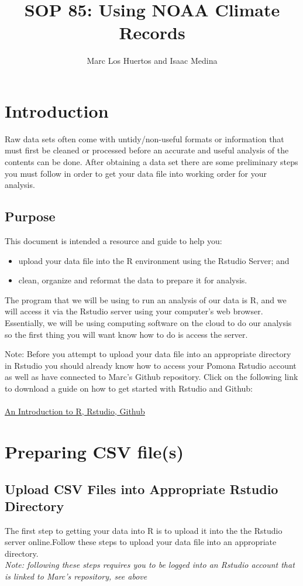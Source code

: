 \documentclass{article}\usepackage[]{graphicx}\usepackage[]{color}
\title{SOP 85: Using NOAA Climate Records}
\author{Marc Los Huertos and Isaac Medina}
\begin{document}
\maketitle

\section{Introduction}
Raw data sets often come with untidy/non-useful formats or information that must first be cleaned or processed before an accurate and useful analysis of the contents can be done. After obtaining a data set there are some preliminary steps you must follow in order to get your data file into working order for your analysis. 

\subsection{Purpose}
This document is intended a resource and guide to help you: 
\begin{itemize}
\item upload your data file into the R environment using the Rstudio Server; and 
\item clean, organize and reformat the data to prepare it for analysis. 
\end{itemize}

The program that we will be using to run an analysis of our data is R, and we will access it via the Rstudio server using your computer's web browser. Essentially, we will be using computing software on the cloud to do our analysis so the first thing you will want know how to do is access the server. 

Note: Before you attempt to upload your data file into an appropriate directory in Rstudio you should already know how to access your Pomona Rstudio account as well as have connected to Marc's Github repository. Click on the following link to download a guide on how to get started with Rstudio and Github: \\
\\
\href{https://github.com/marclos/SOPs/raw/master/06_Rstudio_Github/Rstudio-and-Github_v03.pdf}{An Introduction to R, Rstudio, Github}

\section{Preparing CSV file(s)}



\subsection{Upload CSV Files into Appropriate Rstudio Directory} 
The first step to getting your data into R is to upload it into the the Rstudio server online.Follow these steps to upload your data file into an appropriate directory.\\ \emph{Note: following these steps requires you to be logged into an Rstudio account that is linked to Marc's repository, see above}
\end{document}
